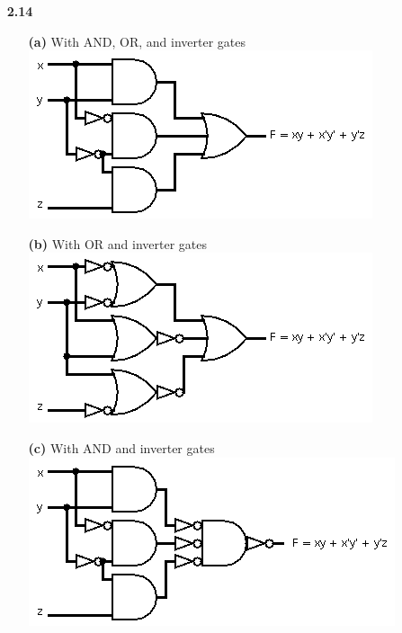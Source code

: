\documentclass{article}
\begin{document}
\begin{itemize}
	\item [\textbf{2.14}]
	\begin{itemize}
		\item [\textbf{(a)}] With AND, OR, and inverter gates\\
		\includegraphics{214a}
		\item [\textbf{(b)}] With OR and inverter gates\\
		\includegraphics{214b}
		\item [\textbf{(c)}] With AND and inverter gates\\
		\includegraphics{214c}
	\end{itemize}


\end{itemize}
\end{document}
